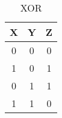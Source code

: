 
\begin{table}[htbp]
    \centering
    \begin{tabular}{|c|c|c|}
        \hline \textbf{X} &  \textbf{Y} & \textbf{Z}\\ \hline
        0 & 0 & 0\\ \hline
        1 & 0 & 1\\ \hline
        0 & 1 & 1\\ \hline
        1 & 1 & 0\\ \hline
    \end{tabular}
    \caption{XOR}
    \label{tab:xor}
\end{table}